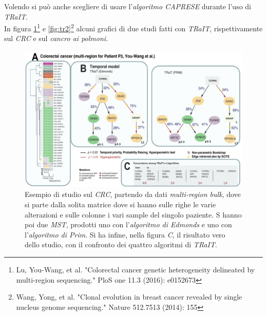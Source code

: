 \documentclass[a4paper,12pt, oneside]{book}
\begin{document}
 Volendo si può anche scegliere di usare l'\textit{algoritmo CAPRESE} durante
 l'uso di \textit{TRaIT}.\\
 In figura \ref{fig:tr1}\footnote{Lu, You-Wang, et al. "Colorectal cancer
   genetic heterogeneity delineated by multi-region sequencing." PloS one 11.3
(2016): e0152673} e \ref{fig:tr2}\footnote{Wang, Yong, et al. "Clonal evolution
in breast cancer revealed by single nucleus genome sequencing." Nature 512.7513
(2014): 155} alcuni grafici di
due studi fatti con \textit{TRaIT}, rispettivamente sul \textit{CRC} e sul
\textit{cancro ai polmoni}.
\begin{figure}
  \centering
  \includegraphics[scale = 0.28]{img/tr1.jpg}
  \caption{Esempio di studio sul \textit{CRC}, partendo da dati
    \textit{multi-region bulk}, dove si parte dalla solita
    matrice dove si hanno sulle righe le varie alterazioni e sulle colonne i
    vari sample del singolo paziente. S hanno poi due \textit{MST}, prodotti uno
    con l'\textit{algoritmo di Edmonds} e uno con l'\textit{algoritmo di
      Prim}. Si ha infine, nella figura \textit{C}, il risultato vero dello
    studio, con il confronto dei quattro algoritmi di \textit{TRaIT}.} 
  \label{fig:tr1}
\end{figure}
\end{document}

